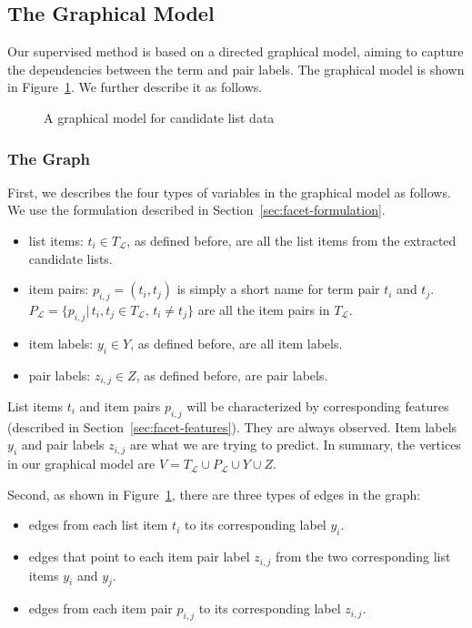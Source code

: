 \subsection{The Graphical Model}
\label{sec:facet-model}
Our supervised method is based on a directed graphical model, aiming to capture the dependencies between the term and pair labels. The graphical model is shown in Figure~\ref{fig:gm}. We further describe it as follows.

\begin{figure}[ht!]
\centering
{}
\caption{A graphical model for candidate list data}
\label{fig:gm}
\end{figure}

\subsubsection{The Graph}
First, we describes the four types of variables in the graphical model as follows. We use the formulation described in Section~\ref{sec:facet-formulation}.
\begin{itemize}
 \item list items: $t_i \in T_\mathcal{L}$, as defined before, are all the list items from the extracted candidate lists.
 \item item pairs: $p_{i,j}=(t_i,t_j)$ is simply a short name for term pair $t_i$ and $t_j$. $P_{\mathcal{L}}=\{p_{i,j}|\, t_i,t_j\!\in\!T_{\mathcal{L}}, \, t_i \!\neq\! t_j \}$ are all the item pairs in $T_\mathcal{L}$.
 \item item labels: $y_i \in Y$, as defined before, are all item labels.
  \item pair labels: $z_{i,j} \in Z$, as defined before, are pair labels.
\end{itemize}
List items $t_i$ and item pairs $p_{i,j}$ will be characterized by corresponding features (described in Section~\ref{sec:facet-features}). They are always observed. Item labels $y_i$ and pair labels $z_{i,j}$ are what we are trying to predict. In summary, the vertices in our graphical model are $V=T_{\mathcal{L}} \cup P_{\mathcal{L}} \cup Y \cup Z$.

Second, as shown in Figure~\ref{fig:gm}, there are three types of edges in the graph:
\begin{itemize}
 \item edges from each list item $t_i$ to its corresponding label $y_i$. 
 \item edges that point to each item pair label $z_{i,j}$ from the two corresponding list items $y_i$ and $y_j$.
 \item edges from each item pair $p_{i,j}$ to its corresponding label $z_{i,j}$.
\end{itemize}

